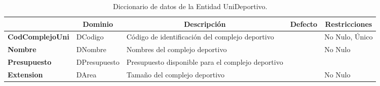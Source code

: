 \begin{table}[H]
\centering
\caption{Diccionario de datos de la Entidad UniDeportivo.}
\label{tab-Dicc-18}
\begin{tabular}{>{\bfseries}m{4.0cm}>{}m{3.0cm}>{}m{6.0cm}>{}m{5.0cm}>{}m{2.0cm}}
\toprule
\multicolumn{1}{c}{\textbf{Atributo}} & \multicolumn{1}{c}{\textbf{Dominio}} & \multicolumn{1}{c}{\textbf{Descripción}} & \multicolumn{1}{c}{\textbf{Defecto}} & \multicolumn{1}{c}{\textbf{Restricciones}} \\ \midrule
CodComplejoUni	&	DCodigo	&	Código de identificación del complejo deportivo	&		&	No Nulo, Único\\
Nombre	&	DNombre	&	Nombres del complejo deportivo	&		&	No Nulo\\
Presupuesto	&	DPresupuesto	&	Presupuesto disponible para el complejo deportivo	&		&	\\
Extension	&	DArea	&	Tamaño del complejo deportivo	&		&	No Nulo\\\bottomrule
\end{tabular}
\end{table}